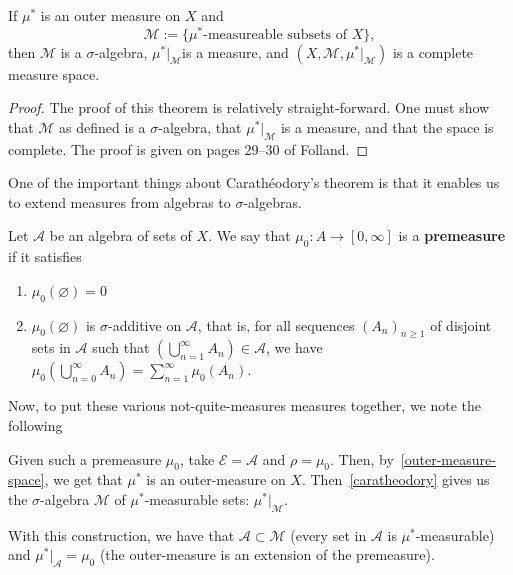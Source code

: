 \documentclass[11pt,leqno,oneside]{amsbook}
\numberwithin{thm}{section}
\renewcommand{\A}{\mathcal{A}} %
\newcommand{\M}{\mathcal{M}} %
\newcommand{\Ep}{\mathcal{E}} %
\newcommand{\s}{$\sigma$-} %
\renewcommand{\emptyset}{\varnothing}
\renewcommand{\de}{\textbf} %
\begin{document}
\begin{thm}[Carathéodory]\label{caratheodory}
  If $\mu^*$ is an outer measure on $X$ and \[
    \M := \{\mu^*\text{-measureable subsets of }X\},
  \]
  then $\M$ is a \s algebra, $\mu^*|_\M$is a measure, and
  $(X,\M,\mu^*|_\M)$ is a complete measure space.
\end{thm}
\begin{proof}
  The proof of this theorem is relatively straight-forward. One must
  show that $\M$ as defined is a \s algebra, that $\mu^*|_\M$ is
  a measure, and that the space is complete. The proof is given on
  pages 29--30 of Folland.
\end{proof}
One of the important things about Carathéodory's theorem is that it
enables us to extend measures from algebras to \s algebras.
\begin{defn}
  Let $\A$ be an algebra of sets of $X$. We say that $\mu_0 \colon A \to
  [0,\infty]$ is a \de{premeasure} if it satisfies
  \begin{enumerate}
  \item $\mu_0(\emptyset) = 0$
  \item $\mu_0(\emptyset)$ is \s additive on $\A$, that is, for
    all sequences $(A_n)_{n \geq 1}$ of disjoint sets in $\A$ such
    that $\left(\bigcup_{n=1}^\infty A_n\right) \in \A$, we have $\mu_0\left(
      \bigcup_{n=0}^\infty A_n \right) = \sum_{n=1}^\infty
    \mu_0(A_n)$.
  \end{enumerate}
\end{defn}
Now, to put these various not-quite-measures measures together, we
note the following
\begin{rmk}
  Given such a premeasure $\mu_0$, take $\Ep = \A$ and $\rho =
  \mu_0$. Then, by~\ref{outer-measure-space}, we get that $\mu^*$ is
  an outer-measure on $X$. Then~\ref{caratheodory} gives us the \s algebra $\M$
  of $\mu^*$-measurable sets: $\mu^*|_\M$.
\end{rmk}
\begin{thm}\label{premeas-extension}
  With this construction, we have that $\A \subset \M$ (every set in $\A$ is $\mu^*$-measurable) and $\mu^*|_\A
  = \mu_0$ (the outer-measure is an extension of the premeasure).
\end{thm}
\end{document}
